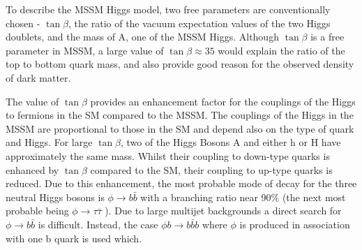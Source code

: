 To describe the MSSM Higgs model, two free parameters are conventionally chosen - $\tan\beta$, the ratio of the vacuum expectation values of the two Higgs doublets, and the mass of A, one of the MSSM Higgs. Although $\tan\beta$ is a free parameter in MSSM, a large value of $\tan\beta \approx 35$ would explain the ratio of the top to bottom quark mass, and also provide good reason for the observed density of dark matter.

The value of $\tan\beta$ provides an enhancement factor for the couplings of the Higgs to fermions in the SM compared to the MSSM. The couplings of the Higgs in the MSSM are proportional to those in the SM and depend also on the type of quark and Higgs. For large $\tan\beta$, two of the Higgs Bosons A and either h or H have approximately the same mass. Whilst their coupling to down-type quarks is enhanced by $\tan\beta$ compared to the SM, their coupling to up-type quarks is reduced.  Due to this enhancement, the most probable mode of decay for the three neutral Higgs bosons is $\phi  \rightarrow b\bar{b} $  with a branching ratio near 90\% (the next most probable being 
$\phi  \rightarrow \tau\bar{\tau} $ ). Due to large multijet backgrounds a direct search for $\phi \rightarrow b\bar{b} $ is difficult. Instead, the case $\phi b \rightarrow b\bar{b}b $ where $\phi$ is produced in association with one b quark is used which.
